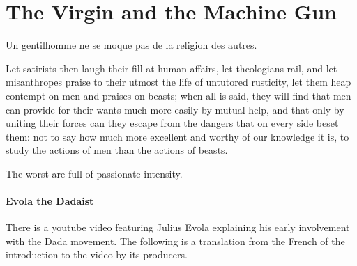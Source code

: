 \section{The Virgin and the Machine Gun}

\begin{quotex}
Un gentilhomme ne se moque pas de la religion des autres. 

Let satirists then laugh their fill at human affairs, let theologians rail, and let misanthropes praise to their utmost the life of untutored rusticity, let them heap contempt on men and praises on beasts; when all is said, they will find that men can provide for their wants much more easily by mutual help, and that only by uniting their forces can they escape from the dangers that on every side beset them: not to say how much more excellent and worthy of our knowledge it is, to study the actions of men than the actions of beasts. 

The worst are full of passionate intensity. 

\end{quotex}
\paragraph{Evola the Dadaist}
There is a youtube video featuring Julius Evola explaining his early involvement with the Dada movement. The following is a translation from the French of the introduction to the video by its producers. 

